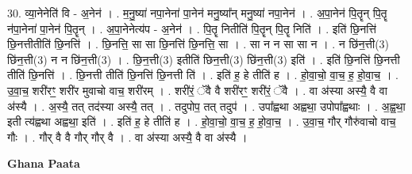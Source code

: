 \documentclass[17pt]{extarticle}
\begin{document}
30. व्या॒नेनेति॑ वि - अ॒नेन॑ । . म॒नु॒ष्या॑ नपा॒नेना॑ पा॒नेन॑ मनु॒ष्या᳚न् मनु॒ष्या॑ नपा॒नेन॑ । . अ॒पा॒नेन॑ पि॒तॄन् पि॒तॄ न॑पा॒नेना॑ पा॒नेन॑ पि॒तॄन् । . अ॒पा॒नेनेत्य॑प - अ॒नेन॑ । . पि॒तॄ नितीति॑ पि॒तॄन् पि॒तॄ निति॑ । . इति॑ छि॒नत्ति॑ छि॒नत्तीतीति॑ छि॒नत्ति॑ । . छि॒नत्ति॒ सा सा छि॒नत्ति॑ छि॒नत्ति॒ सा । . सा न न सा सा न । . न छि॑न॒त्ती(3) छि॑न॒त्ती(3) न न छि॑न॒त्ती(3) । . छि॒न॒त्ती(3) इतीति॑ छिन॒त्ती(3) छि॑न॒त्ती(3) इति॑ । . इति॑ छि॒नत्ति॑ छि॒नत्ती तीति॑ छि॒नत्ति॑ । . छि॒नत्ती तीति॑ छि॒नत्ति॑ छि॒नत्ती ति॑ । . इति॑ ह॒ हे तीति॑ ह । . हो॒वा॒चो॒ वा॒च॒ ह॒ हो॒वा॒च॒ । . उ॒वा॒च॒ शरी॑रꣳ॒॒ शरी॑र मुवाचो वाच॒ शरी॑रम् । . शरी॑रं॒ ॅवै वै शरी॑रꣳ॒॒ शरी॑रं॒ ॅवै । . वा अ॑स्या अस्यै॒ वै वा अ॑स्यै । . अ॒स्यै॒ तत् तद॑स्या अस्यै॒ तत् । . तदुपोप॒ तत् तदुप॑ । . उपा᳚ह्वथा अह्वथा॒ उपोपा᳚ह्वथाः । . अ॒ह्व॒था॒ इती त्य॑ह्वथा अह्वथा॒ इति॑ । . इति॑ ह॒ हे तीति॑ ह । . हो॒वा॒चो॒ वा॒च॒ ह॒ हो॒वा॒च॒ । . उ॒वा॒च॒ गौर् गौरु॑वाचो वाच॒ गौः । . गौर् वै वै गौर् गौर् वै । . वा अ॑स्या अस्यै॒ वै वा अ॑स्यै । \newline

\textbf{Ghana Paata } \newline
\end{document}
